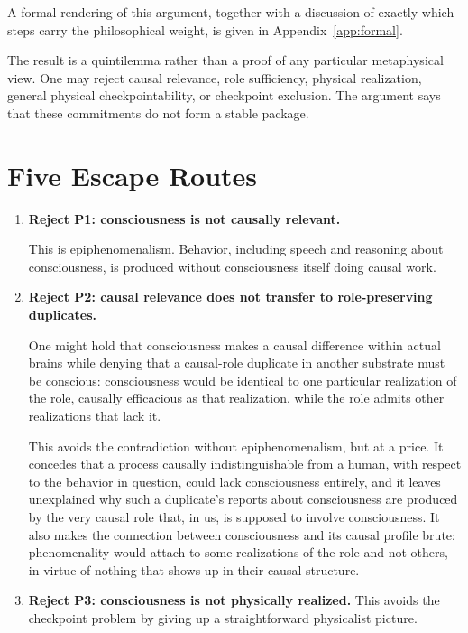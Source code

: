 \documentclass[11pt]{article}
\begin{document}
\noindent
A formal rendering of this argument, together with a discussion of exactly
which steps carry the philosophical weight, is given in
Appendix~\ref{app:formal}.

The result is a quintilemma rather than a proof of any particular metaphysical
view. One may reject causal relevance, role sufficiency, physical realization,
general physical checkpointability, or checkpoint exclusion. The argument says
that these commitments do not form a stable package.

\section{Five Escape Routes}
\label{sec:escapes}

\begin{enumerate}[label=\textbf{\arabic*.}]
  \item \textbf{Reject P1: consciousness is not causally relevant.}

        This is epiphenomenalism. Behavior, including speech and reasoning
        about consciousness, is produced without consciousness itself doing
        causal work.

  \item \textbf{Reject P2: causal relevance does not transfer to
          role-preserving duplicates.}

        One might hold that consciousness makes a causal difference within
        actual brains while denying that a causal-role duplicate in another
        substrate must be conscious: consciousness would be identical to one
        particular realization of the role, causally efficacious as that
        realization, while the role admits other realizations that lack it.

        This avoids the contradiction without epiphenomenalism, but at a
        price. It concedes that a process causally indistinguishable from a
        human, with respect to the behavior in question, could lack
        consciousness entirely, and it leaves unexplained why such a
        duplicate's reports about consciousness are produced by the very
        causal role that, in us, is supposed to involve consciousness. It also
        makes the connection between consciousness and its causal profile
        brute: phenomenality would attach to some realizations of the role and
        not others, in virtue of nothing that shows up in their causal
        structure.

  \item \textbf{Reject P3: consciousness is not physically realized.}
        This avoids the checkpoint problem by giving up a straightforward
        physicalist picture.


\end{enumerate}
\end{document}
